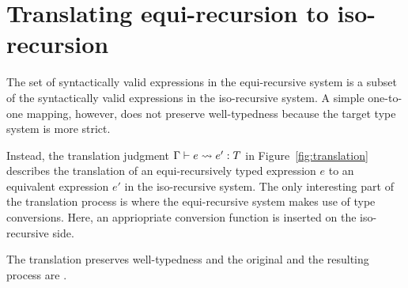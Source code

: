 \section{Translating equi-recursion to iso-recursion}

The set of syntactically valid expressions in the equi-recursive system is a
subset of the syntactically valid expressions in the iso-recursive system. A
simple one-to-one mapping, however, does not preserve well-typedness because
the target type system is more strict.



Instead, the translation judgment $\translation e {e'} T$ in
Figure~\ref{fig:translation} describes the translation of an equi-recursively
typed expression $e$ to an equivalent expression $e'$ in the iso-recursive
system. The only interesting part of the translation process is where the
equi-recursive system makes use of type conversions. Here, an appriopriate
conversion function is inserted on the iso-recursive side.
\begin{mathpar}
\end{mathpar}

The translation preserves well-typedness and the original and the
resulting process are .  

